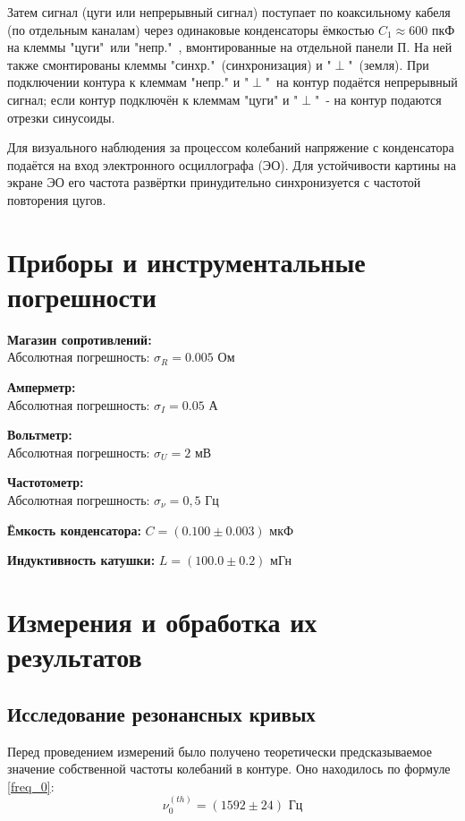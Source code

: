 \documentclass[15pt,a5paper,reqno]{article}
\begin{document}
    Затем сигнал (цуги или непрерывный сигнал) поступает по коаксильному кабеля (по отдельным каналам) через одинаковые конденсаторы ёмкостью $C_1 \approx 600\text{ пкФ}$ на клеммы "цуги"\ или "непр."\ , вмонтированные на отдельной панели П. На ней также смонтированы клеммы "синхр."\ (синхронизация) и "$\perp$"\ (земля). При подключении контура к клеммам "непр." и "$\perp$"\ на контур подаётся непрерывный сигнал; если контур подключён к клеммам "цуги" и "$\perp$"\ - на контур подаются отрезки синусоиды.

    Для визуального наблюдения за процессом колебаний напряжение с конденсатора подаётся на вход электронного осциллографа (ЭО). Для устойчивости картины на экране ЭО его частота развёртки принудительно синхронизуется с частотой повторения цугов.
    
\section{Приборы и инструментальные погрешности}

    \noindent\textbf{Магазин сопротивлений:}\\
        Абсолютная погрешность: $\sigma_R = 0.005\text{ Ом}$

    \noindent\textbf{Амперметр:}\\
        Абсолютная погрешность: $\sigma_I = 0.05\text{ А}$

    \noindent\textbf{Вольтметр:}\\
        Абсолютная погрешность: $\sigma_U = 2\text{ мВ}$

    \noindent\textbf{Частотометр:}\\
        Абсолютная погрешность: $\sigma_{\nu} = 0,5\text{ Гц}$

    \noindent\textbf{Ёмкость конденсатора:} $C = (0.100 \pm 0.003)\text{ мкФ}$

    \noindent\textbf{Индуктивность катушки:} $L = (100.0 \pm 0.2)\text{ мГн}$

\section{Измерения и обработка их результатов}

    \subsection{Исследование резонансных кривых}

        Перед проведением измерений было получено теоретически предсказываемое значение собственной частоты колебаний в контуре. Оно находилось по формуле \eqref{freq_0}:
        \[\boxed{\nu_{0}^{(th)} = (1592\pm24)\text{ Гц}}\]
\end{document}
